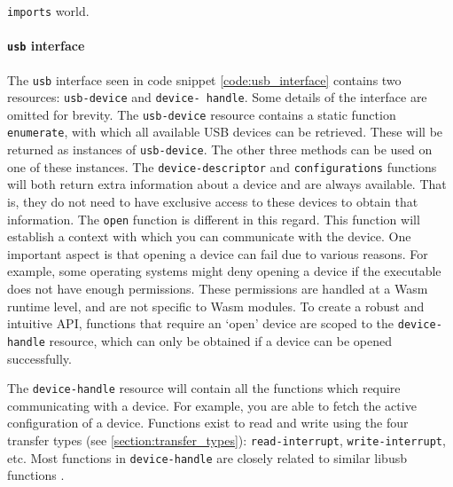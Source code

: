 \begin{code}

\caption{\texttt{imports} world.}
\label{code:world}
\end{code}

\paragraph{\texttt{usb} interface}
The \texttt{usb} interface seen in code snippet \ref{code:usb_interface} contains two resources: \texttt{usb-device} and \texttt{device- handle}. Some details of the interface are omitted for brevity. The \texttt{usb-device} resource contains a static function \texttt{enumerate}, with which all available USB devices can be retrieved. These will be returned as instances of \texttt{usb-device}. The other three methods can be used on one of these instances. The \texttt{device-descriptor} and \texttt{configurations} functions will both return extra information about a device and are always available. That is, they do not need to have exclusive access to these devices to obtain that information. The \texttt{open} function is different in this regard. This function will establish a context with which you can communicate with the device. One important aspect is that opening a device can fail due to various reasons. For example, some operating systems might deny opening a device if the executable does not have enough permissions. These permissions are handled at a \acrshort{Wasm} runtime level, and are not specific to \acrshort{Wasm} modules. To create a robust and intuitive \acrshort{API}, functions that require an `open' device are scoped to the \texttt{device-handle} resource, which can only be obtained if a device can be opened successfully.

The \texttt{device-handle} resource will contain all the functions which require communicating with a device. For example, you are able to fetch the active configuration of a device. Functions exist to read and write using the four transfer types (see \ref{section:transfer_types}): \texttt{read-interrupt}, \texttt{write-interrupt}, etc. Most functions in \texttt{device-handle} are closely related to similar libusb functions \cite{libusb_docs}. \\


